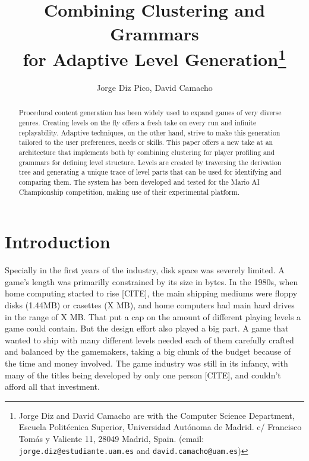 \documentclass[conference]{IEEEtran}
\begin{document}
\title{\ \\ \LARGE\bf Combining Clustering and Grammars \\ for Adaptive Level Generation\thanks{Jorge Diz and David Camacho are with the Computer Science Department, Escuela Politécnica Superior, Universidad Autónoma de Madrid. c/ Francisco Tomás y Valiente 11, 28049 Madrid, Spain. (email: {\tt jorge.diz@estudiante.uam.es} and {\tt david.camacho@uam.es})}}

\author{Jorge Diz Pico, David Camacho}


\maketitle

\begin{abstract}
	
	Procedural content generation has been widely used to expand games
	of very diverse genres. Creating levels on the fly offers a fresh
	take on every run and infinite replayability. Adaptive techniques,
	on the other hand, strive to make this generation tailored to the user
	preferences, needs or skills. This paper offers a new take at
	an architecture that implements both by combining clustering
	for player profiling and grammars for defining level structure.
	Levels are created by traversing the derivation tree and
	generating a unique trace of level parts that can be
	used for identifying and comparing them. The system has
	been developed and tested for the Mario AI Championship competition,
	making use of their experimental platform.

\end{abstract}




\section{Introduction}

Specially in the first years of the industry, disk space was severely limited. A game's length was primarilly constrained by its size in bytes. In the 1980s, when home computing started to rise [CITE], the main shipping mediums were floppy disks (1.44MB) or casettes (X MB), and home computers had main hard drives in the range of X MB. That put a cap on the amount of different playing levels a game could contain. But the design effort also played a big part. A game that wanted to ship with many different levels needed each of them carefully crafted and balanced by the gamemakers, taking a big chunk of the budget because of the time and money involved. The game industry was still in its infancy, with many of the titles being developed by only one person [CITE], and couldn't afford all that investment.
\end{document}
